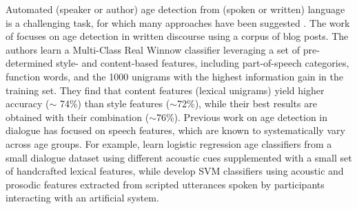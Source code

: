 Automated (speaker or author) age detection from (spoken or written) language is a challenging task, for which many approaches have been suggested \citep{nguyen-etal-2011-author}. The work of \citet{schler2006effects} focuses on age detection in written discourse using a corpus of blog posts. The authors learn a Multi-Class Real Winnow classifier leveraging a set of pre-determined style- and content-based features, including part-of-speech categories, function words, and the 1000 unigrams with the highest information gain in the training set. They find that content features (lexical unigrams) yield higher accuracy ($\sim$ 74\%) than style features ($\sim$72\%), while their best results are obtained with their combination ($\sim$76\%).
Previous work on age detection in dialogue has focused on speech features, which are known to systematically vary across age groups. For example,  \citet{wolters2009age} learn logistic regression age classifiers from a small dialogue dataset %
using different acoustic cues supplemented with a small set of handcrafted lexical features, while \citet{li2013automatic} develop SVM classifiers using acoustic and prosodic features extracted from scripted utterances spoken by participants interacting with an artificial system. 

